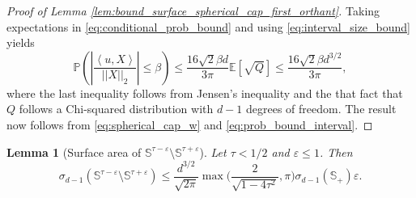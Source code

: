 \documentclass{article}
\numberwithin{equation}{section}
\newtheorem{lemma}{Lemma}[section]
\renewcommand{\P}{\mathbb{P}}
\newcommand{\E}{\mathbb{E}}
\newcommand{\sphere}{\mathbb{S}}
\newcommand{\innerprod}[2]{\left\langle #1, #2 \right\rangle}
\begin{document}
\begin{proof}[Proof of Lemma
    \ref{lem:bound_surface_spherical_cap_first_orthant}]
    Taking expectations in \eqref{eq:conditional_prob_bound} and using
    \eqref{eq:interval_size_bound} yields
    \begin{equation*}
        \P\left( \left|\frac{\innerprod{u}{X}}{||X||_2} \right|\leq
        \beta \right) \leq
        \frac{16\sqrt{2}\beta d}{3\pi} \E[\sqrt{Q}]\leq
        \frac{16\sqrt{2}\beta d^{3/2}}{3\pi},
    \end{equation*}
    where the last inequality follows from Jensen's inequality and the that fact
    that \(Q\) follows a Chi-squared distribution with \(d-1\) degrees
    of freedom. The result now follows from
    \eqref{eq:spherical_cap_w} and \eqref{eq:prob_bound_interval}.
\end{proof}


    
    \begin{lemma}[Surface area of $\sphere^{\tau-\varepsilon}\setminus\sphere^{\tau+\varepsilon }$]\label{lem:surface_sphere_tau_plusminus_eps}
      Let $\tau<1/2$ and $\varepsilon \le 1$. Then
$$
      \sigma_{d-1}(\sphere^{\tau-\varepsilon }\setminus\sphere^{\tau+\varepsilon }) \le
      \frac{d^{3/2}}{\sqrt{2\pi}}
      \max\Big(\frac{2 }{\sqrt{1 - 4\tau^2}}, 
       \pi%
       \Big)
      \sigma_{d-1}(\sphere_+) \varepsilon.
      $$
    
    \end{lemma}
\end{document}
